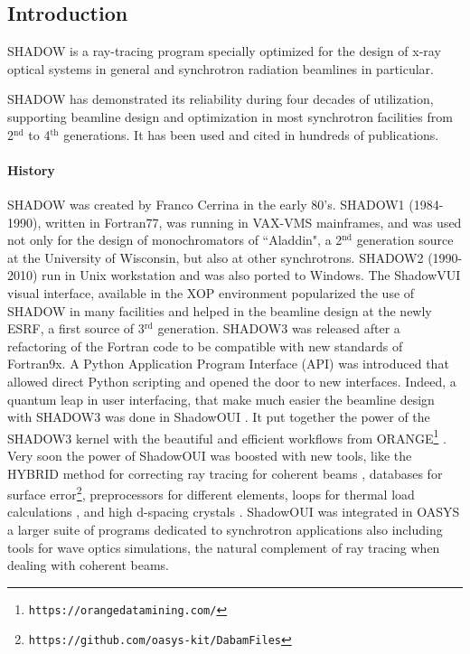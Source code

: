 \subsection{Introduction}

SHADOW is a ray-tracing program specially optimized for the design of x-ray optical systems in general and synchrotron radiation beamlines in particular.

SHADOW has demonstrated its reliability during four decades of utilization, supporting beamline design and optimization in most synchrotron facilities from 2$^\text{nd}$ to 4$^\text{th}$ generations. It has been used and cited in hundreds of publications.

\paragraph{History}
SHADOW was created by Franco Cerrina \cite{cerrina1984shadow} in the early 80's. SHADOW1 (1984-1990), written in Fortran77,  was running in VAX-VMS mainframes, and was used not only for the design of monochromators of ``Aladdin", a 2$^\text{nd}$ generation source at the University of Wisconsin, but also at other synchrotrons. SHADOW2 (1990-2010) run in Unix workstation and was also ported to Windows. The ShadowVUI visual interface, available in the XOP environment \cite{xop1997} popularized the use of SHADOW in many facilities and helped in the beamline design at the newly ESRF, a first source of 3$^\text{rd}$ generation. SHADOW3 \cite{shadow3} was released after a refactoring of the Fortran code to be compatible with new standards of Fortran9x. A Python Application Program Interface (API) \cite{Canestrari2011} was introduced that allowed direct Python scripting and opened the door to new interfaces. Indeed, a quantum leap in user interfacing, that make much easier the beamline design with SHADOW3 was done in ShadowOUI \cite{ShadowOUI}. It put together the power of the SHADOW3 kernel with the beautiful and efficient workflows from ORANGE\footnote{{\tt https://orangedatamining.com/}} \cite{ORANGE}. Very soon the power of ShadowOUI was boosted with new tools, like the HYBRID method for correcting ray tracing for coherent beams \cite{Shi2014}, databases for surface error\footnote{\tt https://github.com/oasys-kit/DabamFiles}, preprocessors for different elements, loops for thermal load calculations \cite{RebuffiThermal2020}, and high d-spacing crystals \cite{Yu2022}. ShadowOUI was integrated in OASYS \cite{OASYS} a larger suite of programs dedicated to synchrotron applications also including tools for wave optics simulations, the natural complement of ray tracing when dealing with coherent beams.

